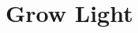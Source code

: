 \documentclass[../../main]{subfiles}
\begin{document}
\section{Grow Light} \label{sec:}
\end{document}
